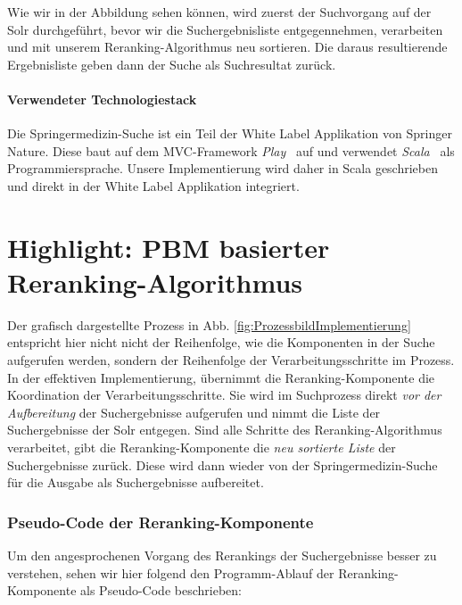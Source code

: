 Wie wir in der Abbildung sehen können, wird zuerst der Suchvorgang auf der Solr durchgeführt, bevor wir die Suchergebnisliste entgegennehmen, verarbeiten und mit unserem Reranking-Algorithmus neu sortieren. Die daraus resultierende Ergebnisliste geben dann der Suche als Suchresultat zurück. 

\paragraph{Verwendeter Technologiestack} 
Die Springermedizin-Suche ist ein Teil der White Label Applikation von Springer Nature. Diese baut auf dem MVC-Framework \textit{Play}~\cite{Play} auf und verwendet \textit{Scala}~\cite{Scala} als Programmiersprache. Unsere Implementierung wird daher in Scala geschrieben und direkt in der White Label Applikation integriert.

\section{Highlight: PBM basierter Reranking-Algorithmus}
\label{sec:Implementierung:PBM}

Der grafisch dargestellte Prozess in Abb. \ref{fig:ProzessbildImplementierung} entspricht hier nicht nicht der Reihenfolge, wie die Komponenten in der Suche aufgerufen werden, sondern der Reihenfolge der Verarbeitungsschritte im Prozess. In der effektiven Implementierung, übernimmt die Reranking-Komponente die Koordination der Verarbeitungsschritte. Sie wird im Suchprozess direkt \textit{vor der Aufbereitung} der Suchergebnisse aufgerufen und nimmt die Liste der Suchergebnisse der Solr entgegen. Sind alle Schritte des Reranking-Algorithmus verarbeitet, gibt die Reranking-Komponente die \textit{neu sortierte Liste} der Suchergebnisse zurück. Diese wird dann wieder von der Springermedizin-Suche für die Ausgabe als Suchergebnisse aufbereitet.

\subsubsection{Pseudo-Code der Reranking-Komponente}
\label{sec:Implementierung:PBM:Pseudocode}

Um den angesprochenen Vorgang des Rerankings der Suchergebnisse besser zu verstehen, sehen wir hier folgend den Programm-Ablauf der Reranking-Komponente als Pseudo-Code beschrieben:

